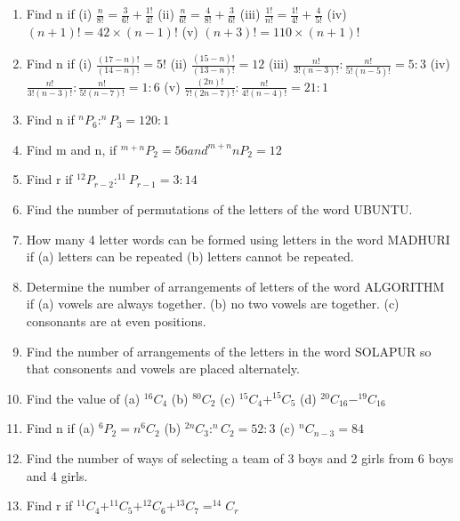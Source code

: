 \documentclass[14pt]{article}
\begin{document}
\begin{multicols}{2}
\begin{enumerate}[resume]
\item Find n if
(i) $\frac{n}{8!}= \frac{3}{6!}+\frac{1!}{4!}$
(ii) $\frac{n}{6!}= \frac{4}{8!}+\frac{3}{6!}$
(iii) $\frac{1!}{n!}= \frac{1!}{4!}+\frac{4}{5!}$
(iv) $(n+1)!=42 \times (n-1)!$
(v) $(n+3)!=110 \times (n+1)!$

\item Find n if
(i) $\frac{(17-n)!}{(14-n)!}= 5!$
(ii) $\frac{(15-n)!}{(13-n)!}= 12$
(iii) $\frac{n!}{3!(n-3)!}:\frac{n!}{5!(n-5)!}=5:3$
(iv) $\frac{n!}{3!(n-3)!}:\frac{n!}{5!(n-7)!}=1:6$
(v) $\frac{(2n)!}{7!(2n-7)!}:\frac{n!}{4!(n-4)!}=21:1$ 

\item Find n if $^nP_6 : ^nP_3=120:1$

\item Find m and n, if $^{m+n}P_2 = 56 and ^{m+n}nP_2=12$

\item Find r if $^12P_{r-2} : ^11P_{r-1}=3:14$

\item Find the number of permutations of the
letters of the word UBUNTU.

\item How many 4 letter words can be formed
using letters in the word MADHURI if
(a) letters can be repeated (b) letters cannot
be repeated.



\item Determine the number of arrangements of
letters of the word ALGORITHM if
(a) vowels are always together.
(b) no two vowels are together.
(c) consonants are at even positions.

\item Find the number of arrangements of the letters
in the word SOLAPUR so that consonents
and vowels are placed alternately.

\item Find the value of  (a) $ ^{16}C_4 $
(b)  $ ^{80}C_2$
(c)  $ ^{15}C_4 + ^{15}C_5 $
(d)  $ ^{20}C_{16} - ^{19}C_{16} $

\item Find n if  (a) $ ^6P_2 = n ^6C_2 $
(b)  $ ^{2n}C_3 : ^nC_2 = 52:3$
(c)  $ ^nC_{n-3}=84$

\item Find the number of ways of selecting a team
of 3 boys and 2 girls from 6 boys and 4 girls.

\item Find r if  $ ^{11}C_4 + ^{11}C_5 + ^{12}C_6 +  ^{13}C_7=^{14}C_r$
 

\end{enumerate}
\end{multicols}
\end{document}
